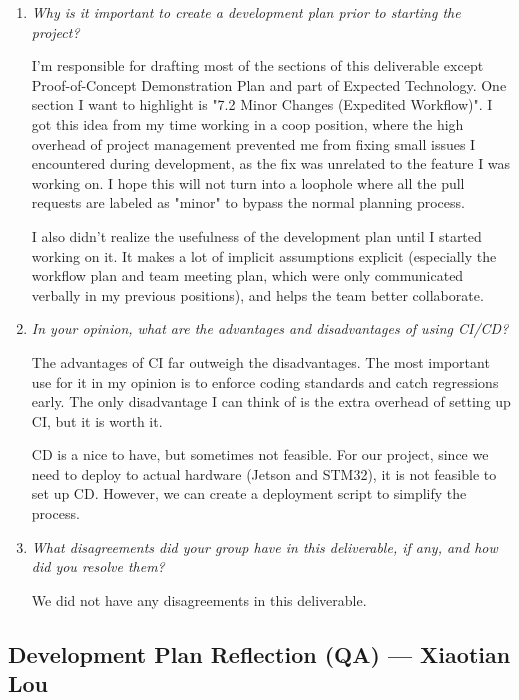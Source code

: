 \documentclass{article}
\begin{document}
\begin{enumerate}
  \item \textit{Why is it important to create a development plan prior to starting the project?}

        I'm responsible for drafting most of the sections of this deliverable except
        Proof-of-Concept Demonstration Plan and part of Expected Technology. One
        section I want to highlight is "7.2 Minor Changes (Expedited Workflow)". I got
        this idea from my time working in a coop position, where the high overhead of
        project management prevented me from fixing small issues I encountered during
        development, as the fix was unrelated to the feature I was working on. I hope
        this will not turn into a loophole where all the pull requests are labeled as
        "minor" to bypass the normal planning process.

        I also didn’t realize the usefulness of the development plan until I started
        working on it. It makes a lot of implicit assumptions explicit (especially the
        workflow plan and team meeting plan, which were only communicated verbally in
        my previous positions), and helps the team better collaborate.

  \item \textit{In your opinion, what are the advantages and disadvantages of using CI/CD?}

        The advantages of CI far outweigh the disadvantages. The most important use for
        it in my opinion is to enforce coding standards and catch regressions early.
        The only disadvantage I can think of is the extra overhead of setting up CI,
        but it is worth it.

        CD is a nice to have, but sometimes not feasible. For our project, since we
        need to deploy to actual hardware (Jetson and STM32), it is not feasible to set
        up CD. However, we can create a deployment script to simplify the process.

  \item \textit{What disagreements did your group have in this deliverable, if any, and how did you resolve them?}

        We did not have any disagreements in this deliverable.
\end{enumerate}

\subsection*{Development Plan Reflection (QA) --- Xiaotian Lou}
\end{document}
